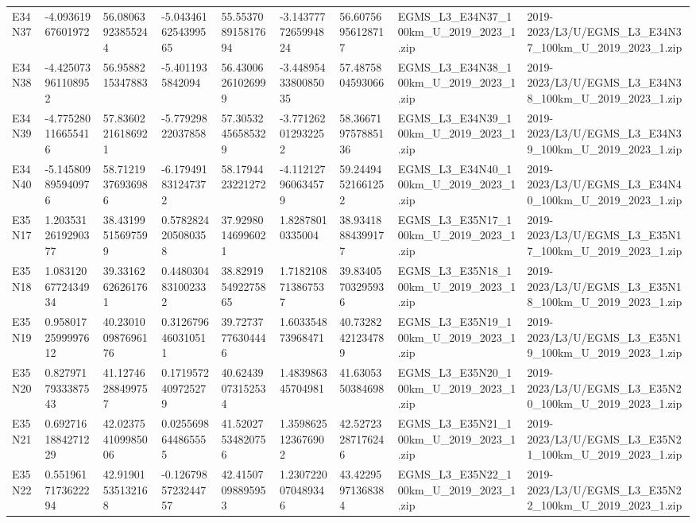 \begin{landscape}
\begin{longtable}{lllllllll}
E34N37 & -4.09361967601972 & 56.08063923855244 & -5.0434616254399565 & 55.553708915817694 & -3.1437777265994824 & 56.60756956128717 & EGMS\_L3\_E34N37\_100km\_U\_2019\_2023\_1.zip & 2019-2023/L3/U/EGMS\_L3\_E34N37\_100km\_U\_2019\_2023\_1.zip \\
E34N38 & -4.425073961108952 & 56.9588215347883 & -5.4011935842094 & 56.43006261026999 & -3.4489543380085035 & 57.4875804593066 & EGMS\_L3\_E34N38\_100km\_U\_2019\_2023\_1.zip & 2019-2023/L3/U/EGMS\_L3\_E34N38\_100km\_U\_2019\_2023\_1.zip \\
E34N39 & -4.775280116655416 & 57.83602216186921 & -5.77929822037858 & 57.30532456585329 & -3.771262012932252 & 58.366719757885136 & EGMS\_L3\_E34N39\_100km\_U\_2019\_2023\_1.zip & 2019-2023/L3/U/EGMS\_L3\_E34N39\_100km\_U\_2019\_2023\_1.zip \\
E34N40 & -5.145809895940976 & 58.71219376936986 & -6.179491831247372 & 58.1794423221272 & -4.112127960634579 & 59.24494521661252 & EGMS\_L3\_E34N40\_100km\_U\_2019\_2023\_1.zip & 2019-2023/L3/U/EGMS\_L3\_E34N40\_100km\_U\_2019\_2023\_1.zip \\
E35N17 & 1.2035312619290377 & 38.43199515697599 & 0.5782824205080358 & 37.92980146996021 & 1.82878010335004 & 38.93418884399177 & EGMS\_L3\_E35N17\_100km\_U\_2019\_2023\_1.zip & 2019-2023/L3/U/EGMS\_L3\_E35N17\_100km\_U\_2019\_2023\_1.zip \\
E35N18 & 1.0831206772434934 & 39.33162626261761 & 0.4480304831002332 & 38.829195492275865 & 1.7182108713867537 & 39.83405703295936 & EGMS\_L3\_E35N18\_100km\_U\_2019\_2023\_1.zip & 2019-2023/L3/U/EGMS\_L3\_E35N18\_100km\_U\_2019\_2023\_1.zip \\
E35N19 & 0.9580172599997612 & 40.230100987696176 & 0.3126796460310511 & 39.72737776304446 & 1.603354873968471 & 40.73282421234789 & EGMS\_L3\_E35N19\_100km\_U\_2019\_2023\_1.zip & 2019-2023/L3/U/EGMS\_L3\_E35N19\_100km\_U\_2019\_2023\_1.zip \\
E35N20 & 0.8279717933387543 & 41.12746288499757 & 0.1719572409725279 & 40.62439073152534 & 1.483986345704981 & 41.6305350384698 & EGMS\_L3\_E35N20\_100km\_U\_2019\_2023\_1.zip & 2019-2023/L3/U/EGMS\_L3\_E35N20\_100km\_U\_2019\_2023\_1.zip \\
E35N21 & 0.6927161884271229 & 42.023754109985006 & 0.0255698644865555 & 41.52027534820756 & 1.3598625123676902 & 42.52723287176246 & EGMS\_L3\_E35N21\_100km\_U\_2019\_2023\_1.zip & 2019-2023/L3/U/EGMS\_L3\_E35N21\_100km\_U\_2019\_2023\_1.zip \\
E35N22 & 0.5519617173622294 & 42.91901535132168 & -0.1267985723244757 & 42.41507098895953 & 1.2307220070489346 & 43.42295971368384 & EGMS\_L3\_E35N22\_100km\_U\_2019\_2023\_1.zip & 2019-2023/L3/U/EGMS\_L3\_E35N22\_100km\_U\_2019\_2023\_1.zip \\

\end{longtable}
\end{landscape}

